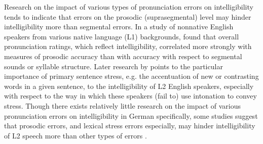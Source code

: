 Research on the impact of various types of pronunciation errors on intelligibility tends to indicate that errors on the prosodic (suprasegmental) level may hinder intelligibility more than segmental errors.
% 
In a study of nonnative English speakers from various native language (L1) backgrounds, \textcite{Anderson-Hsieh1992} found that overall pronunciation ratings, which reflect intelligibility, correlated more strongly with measures of prosodic accuracy than with accuracy with respect to segmental sounds or syllable structure.
%
Later research by \textcite{Hahn2004} points to the particular importance of primary sentence stress, e.g. the accentuation of new or contrasting words in a given sentence, to the intelligibility of L2 English speakers, especially with respect to the way in which these speakers (fail to) use intonation to convey stress.
%
%
Though there exists relatively little research on the impact of various pronunciation errors on intelligibility in German specifically, some studies suggest that prosodic errors, and lexical stress errors especially, may hinder intelligibility of L2 speech more than other types of errors \citep{Hirschfeld1994,Hirschfeld2007}.



